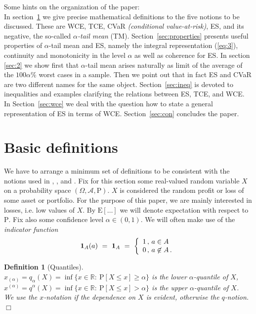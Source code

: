 \documentclass[11pt,a4paper,leqno]{article}
\newtheorem{definition}[theorem]{Definition}
\begin{document}
Some hints on the organization of the paper:\\ 
In section~\ref{sec:1.2} we give precise mathematical definitions to
the five notions to be discussed. These are WCE, TCE, CVaR \emph{(conditional
value-at-risk)}, ES, and its negative, the so-called
\emph{$\alpha$-tail mean} (TM).
Section~\ref{sec:properties} presents useful properties of $\alpha$-tail mean and ES, namely the
integral representation (\ref{eq:3}), continuity and
monotonicity in the level $\alpha$ as well as coherence for ES.
In section \ref{sec:2} we show first that $\alpha$-tail mean arises naturally as limit of the average of the $100 \alpha$\% worst
cases in a sample. Then we point out that in fact ES and CVaR are two different names for the same 
object. Section~\ref{sec:ineq} is devoted to inequalities and examples clarifying
the relations between ES, TCE, and WCE. In Section~\ref{sec:wce} we deal with the question how to state
a general representation of ES in terms of WCE. Section~\ref{sec:con} concludes the paper.

\section{Basic definitions}
\label{sec:1.2}
\setcounter{equation}{0}

We have to arrange a minimum set of definitions to be consistent with
the notions used in \cite{Delb98},  \cite{Pf00}, and \cite{ANS}.
Fix for this section some real-valued random variable $X$ on a probability space $(\Omega, \mathcal{A},
\mathrm{P})$. $X$ is considered the random profit or loss of some asset or portfolio. For the purpose
of this paper, we are mainly interested in losses, i.e. low values of $X$. 
By $\mathrm{E}[\ldots]$ we will denote expectation with respect to $\mathrm{P}$.
Fix also some confidence level $\alpha \in (0,1)$.
We will often make use of the \emph{indicator function}
\begin{equation}\label{eq:5}
\mathbf{1}_A(a)\ =\ \mathbf{1}_A\ =\ \left\{
  \begin{array}{c@{\,,\ }l}
1 & a \in A\\
0 & a \not\in A\,.
  \end{array}
\right.
\end{equation}

\begin{definition}[Quantiles]
  \label{def:1}\ \\
$x_{(\alpha)} = q_\alpha(X) = \inf \{ x\in \mathbb{R}:\ \mathrm{P}[X \le x] \ge \alpha \}$ is the
\emph{lower $\alpha$-quantile} of $X$,\\
$x^{(\alpha)} = q^\alpha(X) = \inf \{ x\in \mathbb{R}:\ \mathrm{P}[X \le x] > \alpha \}$ is the
\emph{upper $\alpha$-quantile} of $X$.\\
We use the $x$-notation if the dependence on $X$ is evident, otherwise the $q$-notion. \hfill $\Box$
\end{definition}
\end{document}
